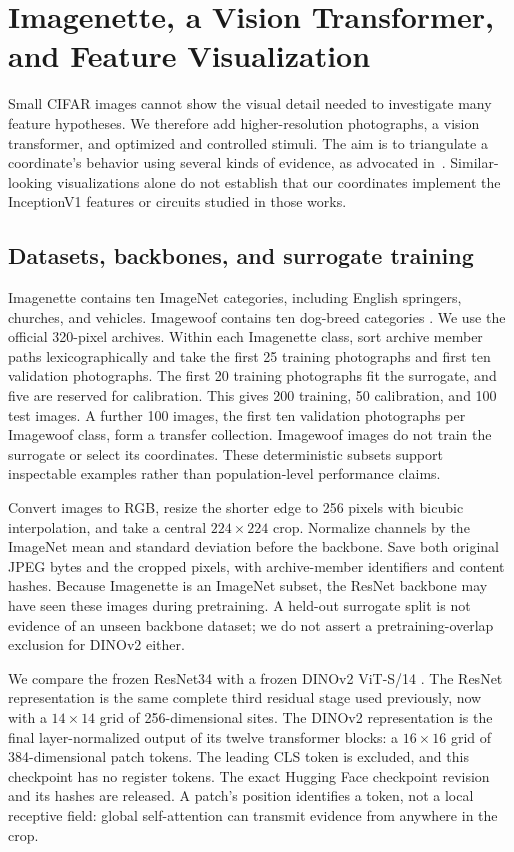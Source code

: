 \section{Imagenette, a Vision Transformer, and Feature Visualization}
\label{sec:feature-visualization}
Small CIFAR images cannot show the visual detail needed to investigate
many feature hypotheses. We therefore add higher-resolution photographs,
a vision transformer, and optimized and controlled stimuli. The aim is
to triangulate a coordinate's behavior using several kinds of evidence,
as advocated in~\cite{olah2020zoom,olah2017featureVis}. Similar-looking
visualizations alone do not establish that our coordinates implement the
InceptionV1 features or circuits studied in those works.

\subsection{Datasets, backbones, and surrogate training}
\label{sub:imagenette-protocol}
Imagenette contains ten ImageNet categories, including English springers,
churches, and vehicles. Imagewoof contains ten dog-breed categories
\cite{howardImagenette}. We use the official 320-pixel archives. Within
each Imagenette class, sort archive member paths lexicographically and
take the first 25 training photographs and first ten validation
photographs. The first 20 training photographs fit the surrogate, and
five are reserved for calibration. This gives 200 training, 50
calibration, and 100 test images. A further 100 images, the first ten
validation photographs per Imagewoof class, form a transfer collection.
Imagewoof images do not train the surrogate or select its coordinates.
These deterministic subsets support inspectable examples rather than
population-level performance claims.

Convert images to RGB, resize the shorter edge to 256 pixels with bicubic
interpolation, and take a central $224\times224$ crop. Normalize channels
by the ImageNet mean and standard deviation before the backbone. Save
both original JPEG bytes and the cropped pixels, with archive-member
identifiers and content hashes. Because Imagenette is an ImageNet subset,
the ResNet backbone may have seen these images during pretraining. A
held-out surrogate split is not evidence of an unseen backbone dataset;
we do not assert a pretraining-overlap exclusion for DINOv2 either.

We compare the frozen ResNet34 with a frozen DINOv2 ViT-S/14
\cite{dosovitskiy2021vit,oquab2024dinov2}. The ResNet representation is the
same complete third residual stage used previously, now with a
$14\times14$ grid of 256-dimensional sites. The DINOv2 representation is
the final layer-normalized output of its twelve transformer blocks:
a $16\times16$ grid of 384-dimensional patch tokens. The leading CLS
token is excluded, and this checkpoint has no register tokens. The exact
Hugging Face checkpoint revision and its hashes are released. A patch's
position identifies a token, not a local receptive field: global
self-attention can transmit evidence from anywhere in the crop.

